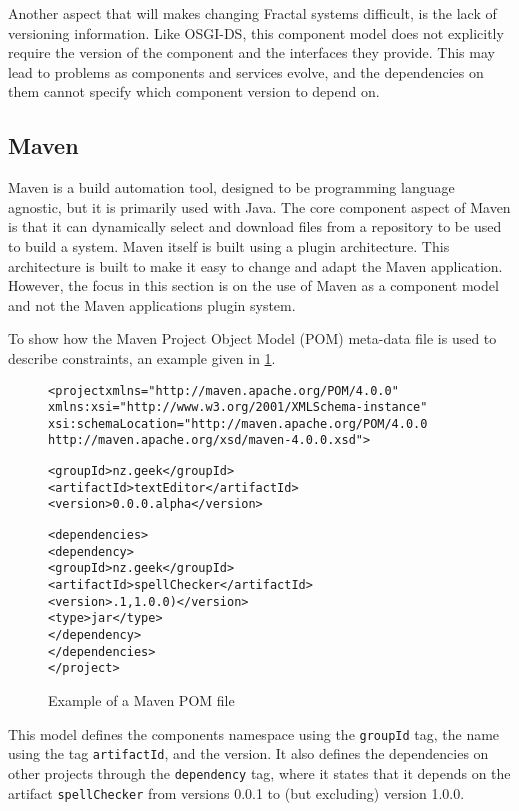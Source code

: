 Another aspect that will makes changing Fractal systems difficult, is the lack of versioning information.
Like OSGI-DS, this component model does not explicitly require the version of the component and the interfaces they provide.
This may lead to problems as components and services evolve, and the dependencies on them cannot specify which component version to depend on.

\subsection{Maven}
Maven is a build automation tool, designed to be programming language agnostic, but it is primarily used with Java.
The core component aspect of Maven is that it can dynamically select and download files from a repository to be used to build a system.
Maven itself is built using a plugin architecture.
This architecture is built to make it easy to change and adapt the Maven application.
However, the focus in this section is on the use of Maven as a component model and not the Maven applications plugin system.

To show how the Maven Project Object Model (POM) meta-data file is used to describe constraints,
 an example given in \ref{mavenmetadata}. 

\begin{figure}[htp]
\begin{center}
\begin{framed}
\begin{alltt}
<project xmlns="http://maven.apache.org/POM/4.0.0"
  xmlns:xsi="http://www.w3.org/2001/XMLSchema-instance"
  xsi:schemaLocation="http://maven.apache.org/POM/4.0.0
                      http://maven.apache.org/xsd/maven-4.0.0.xsd">

  <groupId>nz.geek</groupId>
  <artifactId>textEditor</artifactId>
  <version>0.0.0.alpha</version>

  <dependencies>
    <dependency>
      <groupId>nz.geek</groupId>
      <artifactId>spellChecker</artifactId>
      <version>.1,1.0.0)</version>
      <type>jar</type>
     </dependency>
  </dependencies>
</project>
\end{alltt}
\end{framed}
  \caption{Example of a Maven POM file}
  \label{mavenmetadata}
\end{center}
\end{figure}

This model defines the components namespace using the \texttt{groupId} tag, the name using the tag \texttt{artifactId}, and the version.
It also defines the dependencies on other projects through the \texttt{dependency} tag,
where it states that it depends on the artifact \texttt{spellChecker} from versions 0.0.1 to (but excluding) version 1.0.0.

